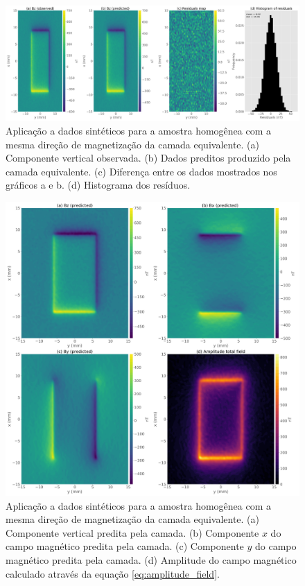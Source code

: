 \begin{figure}
	\centering
	\includegraphics[width=.9\textwidth]{Fig/mag_vec/amostra_homo_correto/results_data_fitting_Bz.png}
	\caption{Aplicação a dados sintéticos para a amostra homogênea com a mesma direção de magnetização da camada equivalente. (a) Componente vertical observada. (b) Dados preditos produzido pela camada equivalente. (c) Diferença entre os dados mostrados nos gráficos a e b. (d) Histograma dos resíduos.}
	\label{fig:datafit_homo_sample_samedir}
\end{figure}

\begin{figure}
	\centering
	\includegraphics[width=1.\textwidth]{Fig/mag_vec/amostra_homo_correto/field_components_eqlayer.png}
	\caption{Aplicação a dados sintéticos para a amostra homogênea com a mesma direção de magnetização da camada equivalente. (a) Componente vertical predita pela camada. (b) Componente $x$ do campo magnético predita pela camada. (c) Componente $y$ do campo magnético predita pela camada. (d) Amplitude do campo magnético calculado através da equação \ref{eq:amplitude_field}.}
	\label{fig:components_homo_sample_samedir}
\end{figure}

